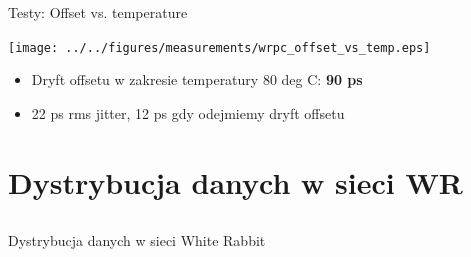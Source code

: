 \documentclass[compress,red]{beamer}
\begin{document}
\begin{frame}{Testy: Offset vs. temperature}

  \begin{center}
    \texttt{[image: ../../figures/measurements/wrpc\_offset\_vs\_temp.eps]}
  \end{center}
  \begin{itemize}
    \item Dryft offsetu w zakresie temperatury 80 deg C: \textbf{90 ps}
    \item 22 ps rms jitter, 12 ps gdy odejmiemy dryft offsetu
  \end{itemize}

\end{frame}




\section{Dystrybucja danych w sieci WR}
\subsection{}
\begin{frame}{Dystrybucja danych w sieci White Rabbit}

  \begin{center}
     \color{red}{Deterministyczny i niezawodny transfer danych}
  \end{center}

\end{frame}
\end{document}
